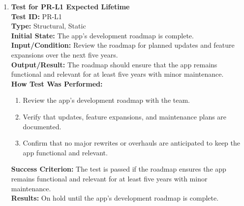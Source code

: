 \documentclass[12pt, titlepage]{article}
\begin{document}
\begin{enumerate}
    \item \textbf{Test for PR-L1 Expected Lifetime} \\
      \newline
      \textbf{Test ID:} PR-L1 \\
      \textbf{Type:} Structural, Static \\
      \textbf{Initial State:} The app’s development roadmap is complete. \\
      \textbf{Input/Condition:} Review the roadmap for planned updates and feature expansions over the next five years. \\
      \textbf{Output/Result:} The roadmap should ensure that the app remains functional and relevant for at least five 
      years with minor maintenance. \\
      \textbf{How Test Was Performed:}
      \begin{enumerate}
          \item Review the app’s development roadmap with the team.
          \item Verify that updates, feature expansions, and maintenance plans are documented.
          \item Confirm that no major rewrites or overhauls are anticipated to keep the app functional and relevant.
      \end{enumerate}
      \textbf{Success Criterion:} The test is passed if the roadmap ensures the app remains functional and relevant for at least five years with minor maintenance.\\
      \textbf{Results:} On hold until the app's development roadmap is complete.\\
    \end{enumerate}
\end{document}
